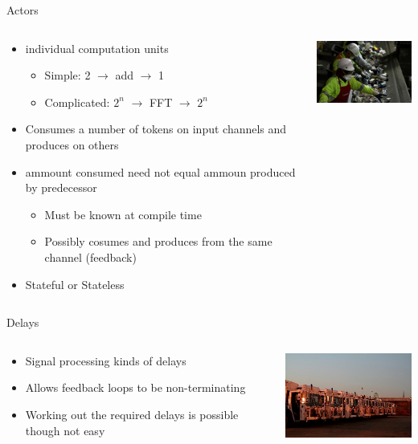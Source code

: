 \documentclass{beamer}
\begin{document}
\begin{frame}{Actors}

\begin{columns}
\begin{column}{6cm}
\begin{itemize}
	\item individual computation units
	\begin{itemize}
		\item Simple: 2 $\rightarrow$ add $\rightarrow$ 1
		\item Complicated: $2^n$ $\rightarrow$ FFT $\rightarrow$ $2^n$
	\end{itemize}
	\item Consumes a number of tokens on input channels and produces on others
	\item ammount consumed need not equal ammoun produced by predecessor
	\begin{itemize}
		\item Must be known at compile time
		\item Possibly cosumes and produces from the same channel (feedback)
	\end{itemize}
	\item Stateful or Stateless
\end{itemize}
\end{column}
\begin{column}{4cm}
\includegraphics[width=4cm]{../res/sf-recycling-center.jpg}
\end{column}
\end{columns}
\end{frame}

\begin{frame}{Delays}
\begin{columns}
\begin{column}{5cm}
\begin{itemize}
	\item Signal processing kinds of delays
	\item Allows feedback loops to be non-terminating
	\item Working out the required delays is possible though not easy
\end{itemize}
\end{column}
\begin{column}{5cm}
\includegraphics[width=5cm]{../res/2007_10_garbtrucks.jpg}
\end{column}
\end{columns}
\end{frame}
\end{document}
